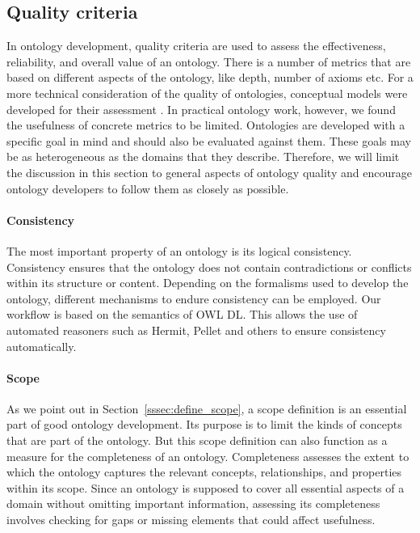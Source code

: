\subsection{Quality criteria}


In ontology development, quality criteria are used to assess the effectiveness, reliability, and overall value of an ontology. There is a number of metrics that are based on different aspects of the ontology, like depth, number of axioms etc. For a more technical consideration of the quality of ontologies, conceptual models were developed for their assessment \cite{WilsonQuality2021, WilsonQuality2023}. In practical ontology work, however, we found the usefulness of concrete metrics to be limited. Ontologies are developed with a specific goal in mind and should also be evaluated against them. These goals may be as heterogeneous as the domains that they describe. Therefore, we will limit the discussion in this section to general aspects of ontology quality and encourage ontology developers to follow them as closely as possible. %

\paragraph{Consistency}

The most important property of an ontology is its logical consistency. Consistency ensures that the ontology does not contain contradictions or conflicts within its structure or content. Depending on the formalisms used to develop the ontology, different mechanisms to endure consistency can be employed. Our workflow is based on the semantics of OWL DL. This allows the use of automated reasoners such as Hermit, Pellet and others to ensure consistency automatically.

\paragraph{Scope}

As we point out in Section~\ref{sssec:define_scope}, a scope definition is an essential part of good ontology development. Its purpose is to limit the kinds of concepts that are part of the ontology. But this scope definition can also function as a measure for the completeness of an ontology. Completeness assesses the extent to which the ontology captures the relevant concepts, relationships, and properties within its scope. Since an ontology is supposed to cover all essential aspects of a domain without omitting important information, assessing its completeness involves checking for gaps or missing elements that could affect usefulness.

